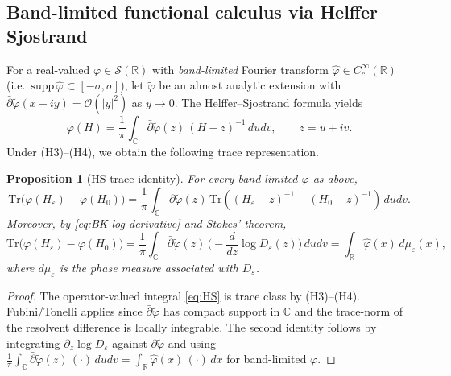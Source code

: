 ﻿\documentclass[12pt,a4paper]{article}
\newtheorem{proposition}[theorem]{Proposition}
\theoremstyle{definition}
\theoremstyle{remark}
\begin{document}
\subsection{Band-limited functional calculus via Helffer--Sjostrand}

For a real-valued $\varphi\in \mathcal{S}(\mathbb{R})$ with \emph{band-limited} Fourier transform $\widehat{\varphi}\in C_c^\infty(\mathbb{R})$ (i.e.\ $\mathrm{supp}\,\widehat{\varphi}\subset[-\sigma,\sigma]$), let $\tilde{\varphi}$ be an almost analytic extension with $\bar{\partial}\tilde{\varphi}(x+iy)=\mathcal{O}(|y|^2)$ as $y\to 0$. The Helffer--Sjostrand formula yields
\begin{equation}\label{eq:HS}
\varphi(H)=\frac{1}{\pi}\int_{\mathbb{C}}\bar{\partial}\tilde{\varphi}(z)\,(H-z)^{-1}\,dudv,
\qquad z=u+iv.
\end{equation}
Under (H3)--(H4), we obtain the following trace representation.

\begin{proposition}[HS-trace identity]\label{prop:HS-trace}
For every band-limited $\varphi$ as above,
\begin{equation}\label{eq:HS-trace-detailed}
\mathrm{Tr}\big(\varphi(H_\varepsilon)-\varphi(H_0)\big)
=\frac{1}{\pi}\int_{\mathbb{C}}\bar{\partial}\tilde{\varphi}(z)\,
\mathrm{Tr}\!\left((H_\varepsilon-z)^{-1}-(H_0-z)^{-1}\right)\,dudv.
\end{equation}
Moreover, by \eqref{eq:BK-log-derivative} and Stokes' theorem,
\begin{equation}\label{eq:HS-trace-BK}
\mathrm{Tr}\big(\varphi(H_\varepsilon)-\varphi(H_0)\big)
=\frac{1}{\pi}\int_{\mathbb{C}}\bar{\partial}\tilde{\varphi}(z)\,\Big(-\frac{d}{dz}\log D_\varepsilon(z)\Big)\,dudv
=\int_{\mathbb{R}}\widehat{\varphi}(x)\,d\mu_\varepsilon(x),
\end{equation}
where $d\mu_\varepsilon$ is the \emph{phase measure} associated with $D_\varepsilon$.
\end{proposition}

\begin{proof}
The operator-valued integral \eqref{eq:HS} is trace class by (H3)--(H4). Fubini/Tonelli applies since $\bar{\partial}\tilde{\varphi}$ has compact support in $\mathbb{C}$ and the trace-norm of the resolvent difference is locally integrable. The second identity follows by integrating $\partial_z \log D_\varepsilon$ against $\bar{\partial}\tilde{\varphi}$ and using $\frac{1}{\pi}\int_{\mathbb{C}}\bar{\partial}\tilde{\varphi}(z)\,(\cdot)\,dudv=\int_{\mathbb{R}}\widehat{\varphi}(x)\,(\cdot)\,dx$ for band-limited $\varphi$.
\end{proof}
\end{document}
